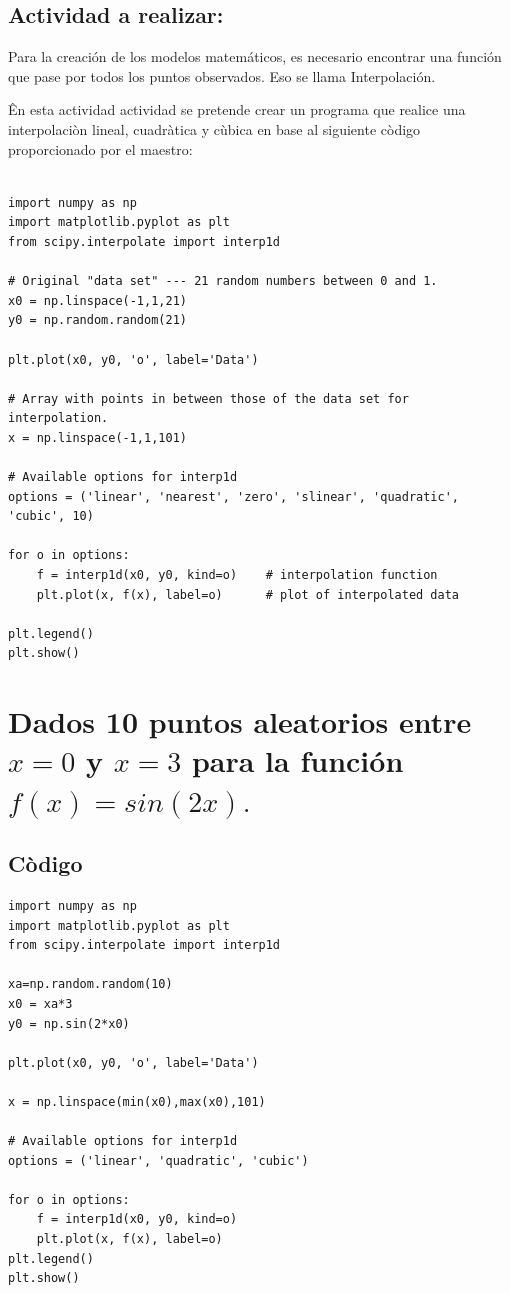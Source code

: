 \documentclass[12pt]{article}
\begin{document}
\subsection{Actividad a realizar:}
Para la creación  de los modelos matemáticos, es necesario encontrar una función que pase por todos los puntos observados. Eso se llama Interpolación.
 
Ên esta actividad actividad se pretende crear un programa que realice una interpolaciòn lineal, cuadràtica y cùbica en base al siguiente còdigo proporcionado por el maestro:
\begin{verbatim}
 
import numpy as np
import matplotlib.pyplot as plt
from scipy.interpolate import interp1d

# Original "data set" --- 21 random numbers between 0 and 1.
x0 = np.linspace(-1,1,21)
y0 = np.random.random(21)

plt.plot(x0, y0, 'o', label='Data')

# Array with points in between those of the data set for interpolation.
x = np.linspace(-1,1,101)

# Available options for interp1d
options = ('linear', 'nearest', 'zero', 'slinear', 'quadratic', 'cubic', 10)

for o in options:
    f = interp1d(x0, y0, kind=o)    # interpolation function
    plt.plot(x, f(x), label=o)      # plot of interpolated data

plt.legend()
plt.show()

\end{verbatim}
\section{Dados 10 puntos aleatorios entre $x=0$ y $x=3$ para la función $f(x) = sin(2 x).$}
\subsection{Còdigo}
\begin{verbatim}
import numpy as np
import matplotlib.pyplot as plt
from scipy.interpolate import interp1d
​
xa=np.random.random(10)
x0 = xa*3
y0 = np.sin(2*x0)
​
plt.plot(x0, y0, 'o', label='Data')
​
x = np.linspace(min(x0),max(x0),101)
​
# Available options for interp1d
options = ('linear', 'quadratic', 'cubic')
​
for o in options:
    f = interp1d(x0, y0, kind=o)   
    plt.plot(x, f(x), label=o)      
plt.legend()
plt.show()
\end{verbatim}
\end{document}
